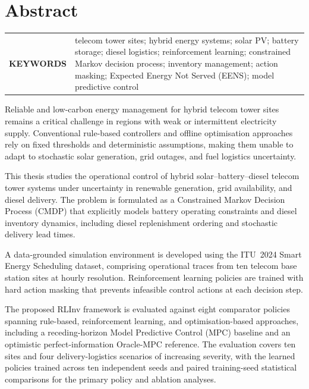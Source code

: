 \chapter*{Abstract}

\begin{tabular}{@{} >{\bfseries}p{} p{} @{}}
\texorpdfstring{\MakeUppercase{Keywords}}{Keywords} &
telecom tower sites; hybrid energy systems; solar PV; battery storage;
diesel logistics; reinforcement learning; constrained Markov decision process;
inventory management; action masking; Expected Energy Not Served (EENS);
model predictive control
\end{tabular}
\par
\begin{doublespacing}

Reliable and low-carbon energy management for hybrid telecom tower sites
remains a critical challenge in regions with weak or intermittent electricity
supply. Conventional rule-based controllers and offline optimisation
approaches rely on fixed thresholds and deterministic assumptions,
making them unable to adapt to stochastic solar generation, grid outages, and
fuel logistics uncertainty.

This thesis studies the operational control of hybrid
solar--battery--diesel telecom tower systems under uncertainty in renewable
generation, grid availability, and diesel delivery. The problem is formulated
as a Constrained Markov Decision Process (CMDP) that explicitly models
battery operating constraints and diesel inventory dynamics, including diesel replenishment ordering and stochastic delivery lead times.

A data-grounded simulation environment is developed using the ITU~2024
Smart Energy Scheduling dataset, comprising operational traces from ten
telecom base station sites at hourly resolution. Reinforcement learning
policies are trained with hard action masking that prevents infeasible control actions at each decision step.

The proposed RLInv framework is evaluated
against eight comparator policies spanning rule-based,
reinforcement learning, and optimisation-based approaches, including a
receding-horizon Model Predictive Control (MPC) baseline and an
optimistic perfect-information Oracle-MPC reference. The evaluation
covers ten sites and four
delivery-logistics scenarios of increasing severity, with the learned
policies trained across ten independent seeds and paired
training-seed statistical comparisons for the primary policy and
ablation analyses.


\end{doublespacing}
